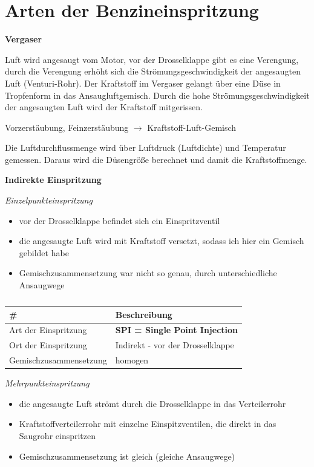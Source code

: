 \section{Arten der
Benzineinspritzung}\label{arten-der-benzineinspritzung}

\textbf{Vergaser}

Luft wird angesaugt vom Motor, vor der Drosselklappe gibt es eine
Verengung, durch die Verengung erhöht sich die Strömungsgeschwindigkeit
der angesaugten Luft (Venturi-Rohr). Der Kraftstoff im Vergaser gelangt
über eine Düse in Tropfenform in das Ansaugluftgemisch. Durch die hohe
Strömungsgeschwindigkeit der angesaugten Luft wird der Kraftstoff
mitgerissen.

Vorzerstäubung, Feinzerstäubung $\to$ Kraftstoff-Luft-Gemisch

Die Luftdurchflussmenge wird über Luftdruck (Luftdichte) und Temperatur
gemessen. Daraus wird die Düsengröße berechnet und damit die
Kraftstoffmenge.

\textbf{Indirekte Einspritzung}

\emph{Einzelpunkteinspritzung}

\begin{itemize}
\item
  vor der Drosselklappe befindet sich ein Einspritzventil
\item
  die angesaugte Luft wird mit Kraftstoff versetzt, sodass ich hier ein
  Gemisch gebildet habe
\item
  Gemischzusammensetzung war nicht so genau, durch unterschiedliche
  Ansaugwege
\end{itemize}

\begin{table}[!ht]%
\centering 
	\caption{}%
\begin{tabular}{@{}ll@{}}
\hline
\textbf{\#} & \textbf{Beschreibung} \\
\hline
Art der Einspritzung & \textbf{SPI = Single Point Injection} \\
Ort der Einspritzung & Indirekt - vor der Drosselklappe \\
Gemischzusammensetzung & homogen \\
\hline
\end{tabular} 
\end{table}

\emph{Mehrpunkteinspritzung}

\begin{itemize}
\item
  die angesaugte Luft strömt durch die Drosselklappe in das
  Verteilerrohr
\item
  Kraftstoffverteilerrohr mit einzelne Einspitzventilen, die direkt in
  das Saugrohr einspritzen
\item
  Gemischzusammensetzung ist gleich (gleiche Ansaugwege)
\end{itemize}

